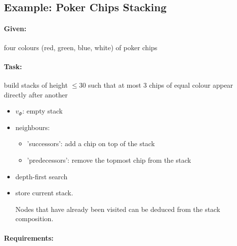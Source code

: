 \documentclass[11pt]{article}
\begin{document}
\subsection{Example: Poker Chips Stacking}

\paragraph{Given:} four colours (red, green, blue, white) of poker chips

\paragraph{Task:} build stacks of height $ \leq 30 $ such that at most 3 chips of equal colour appear directly after another

\begin{itemize}
\item $ v_\Phi $: empty stack
\item neighbours:
	\begin{itemize}
	\item 'successors': add a chip on top of the stack
	\item 'predecessors': remove the topmost chip from the stack
	\end{itemize}
\item depth-first search
	
\item store current stack.

	Nodes that have already been visited can be deduced from the stack composition.
\end{itemize}

\paragraph{Requirements:}
\end{document}
